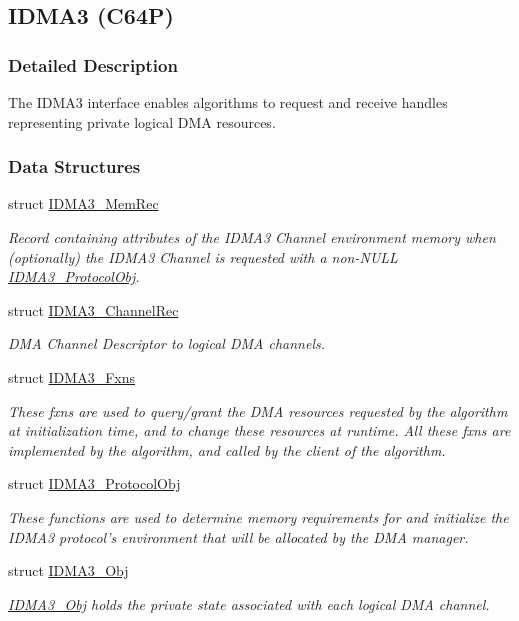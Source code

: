 \hypertarget{group___d_s_p_i_d_m_a3}{
\subsection{IDMA3 (C64P)}
\label{group___d_s_p_i_d_m_a3}
}


\subsubsection{Detailed Description}
The IDMA3 interface enables algorithms to request and receive handles representing private logical DMA resources. 

\subsubsection*{Data Structures}
\begin{CompactItemize}
\item 
struct \hyperlink{struct_i_d_m_a3___mem_rec}{IDMA3\_\-Mem\-Rec}
\begin{CompactList}\small\item\em Record containing attributes of the IDMA3 Channel environment memory when (optionally) the IDMA3 Channel is requested with a non-NULL \hyperlink{struct_i_d_m_a3___protocol_obj}{IDMA3\_\-Protocol\-Obj}. \item\end{CompactList}\item 
struct \hyperlink{struct_i_d_m_a3___channel_rec}{IDMA3\_\-Channel\-Rec}
\begin{CompactList}\small\item\em DMA Channel Descriptor to logical DMA channels. \item\end{CompactList}\item 
struct \hyperlink{struct_i_d_m_a3___fxns}{IDMA3\_\-Fxns}
\begin{CompactList}\small\item\em These fxns are used to query/grant the DMA resources requested by the algorithm at initialization time, and to change these resources at runtime. All these fxns are implemented by the algorithm, and called by the client of the algorithm. \item\end{CompactList}\item 
struct \hyperlink{struct_i_d_m_a3___protocol_obj}{IDMA3\_\-Protocol\-Obj}
\begin{CompactList}\small\item\em These functions are used to determine memory requirements for and initialize the IDMA3 protocol's environment that will be allocated by the DMA manager. \item\end{CompactList}\item 
struct \hyperlink{struct_i_d_m_a3___obj}{IDMA3\_\-Obj}
\begin{CompactList}\small\item\em \hyperlink{struct_i_d_m_a3___obj}{IDMA3\_\-Obj} holds the private state associated with each logical DMA channel. \item\end{CompactList}\end{CompactItemize}
